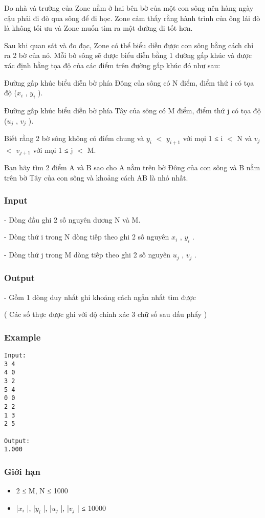 



   Do nhà và trường của Zone nằm ở hai bên bờ của một con sông nên hàng ngày cậu phải đi đò qua sông để đi học. Zone cảm thấy rằng hành trình của ông lái đò là không tối ưu và Zone muốn tìm ra một đường đi tốt hơn.  

   Sau khi quan sát và đo đạc, Zone có thể biểu diễn được con sông bằng cách chỉ ra 2 bờ của nó. Mỗi bờ sông sẽ được biểu diễn bằng 1 đường gấp khúc và được xác định bằng tọa độ của các điểm trên đường gấp khúc đó như sau:  

   Đường gấp khúc biểu diễn bờ phía Đông của sông có N điểm, điểm thứ i có tọa độ ($x_{i}$   , $y_{i}$   ).  

   Đường gấp khúc biểu diễn bờ phía Tây của sông có M điểm, điểm thứ j có tọa độ ($u_{j}$   , $v_{j}$   ).  

   Biết rằng 2 bờ sông không có điểm chung và $y_{i}$   $<$ $y_{i+1}$   với mọi 1 ≤ i $<$ N và $v_{j}$   $<$ $v_{j+1}$   với mọi 1 ≤ j $<$ M.  

   Bạn hãy tìm 2 điểm A và B sao cho A nằm trên bờ Đông của con sông và B nằm trên bờ Tây của con sông và khoảng cách AB là nhỏ nhất.  

\subsubsection{   Input  }

   - Dòng đầu ghi 2 số nguyên dương N và M.  

   - Dòng thứ i trong N dòng tiếp theo ghi 2 số nguyên $x_{i}$   , $y_{i}$   .  

   - Dòng thứ j trong M dòng tiếp theo ghi 2 số nguyên $u_{j}$   , $v_{j}$   .  

\subsubsection{   Output  }

   - Gồm 1 dòng duy nhất ghi khoảng cách ngắn nhất tìm được  

   ( Các số thực được ghi với độ chính xác 3 chữ số sau dấu phẩy )  



\subsubsection{   Example  }
\begin{verbatim}
Input:
3 4
4 0
3 2
5 4
0 0
2 2
1 3
2 5

Output:
1.000
\end{verbatim}

\subsubsection{   Giới hạn  }
\begin{itemize}
	\item     2 ≤ M, N ≤ 1000   
	\item     |$x_{i}$    |, |$y_{i}$    |, |$u_{j}$    |, |$v_{j}$    | ≤ 10000   
\end{itemize}
